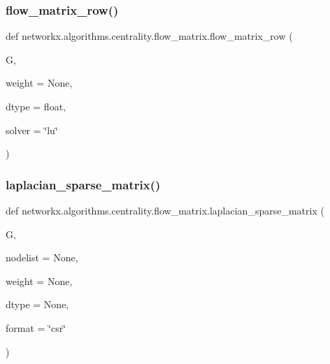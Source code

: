 \subsubsection{\texorpdfstring{flow\+\_\+matrix\+\_\+row()}{flow\_matrix\_row()}}
{\footnotesize\ttfamily def networkx.\+algorithms.\+centrality.\+flow\+\_\+matrix.\+flow\+\_\+matrix\+\_\+row (\begin{DoxyParamCaption}\item[{}]{G,  }\item[{}]{weight = {\ttfamily None},  }\item[{}]{dtype = {\ttfamily float},  }\item[{}]{solver = {\ttfamily \char`\"{}lu\char`\"{}} }\end{DoxyParamCaption})}

\mbox{\label{namespacenetworkx_1_1algorithms_1_1centrality_1_1flow__matrix_a62d1a4ec478568934b9b3a23ca11f1eb}} 
\subsubsection{\texorpdfstring{laplacian\+\_\+sparse\+\_\+matrix()}{laplacian\_sparse\_matrix()}}
{\footnotesize\ttfamily def networkx.\+algorithms.\+centrality.\+flow\+\_\+matrix.\+laplacian\+\_\+sparse\+\_\+matrix (\begin{DoxyParamCaption}\item[{}]{G,  }\item[{}]{nodelist = {\ttfamily None},  }\item[{}]{weight = {\ttfamily None},  }\item[{}]{dtype = {\ttfamily None},  }\item[{}]{format = {\ttfamily \char`\"{}csr\char`\"{}} }\end{DoxyParamCaption})}


